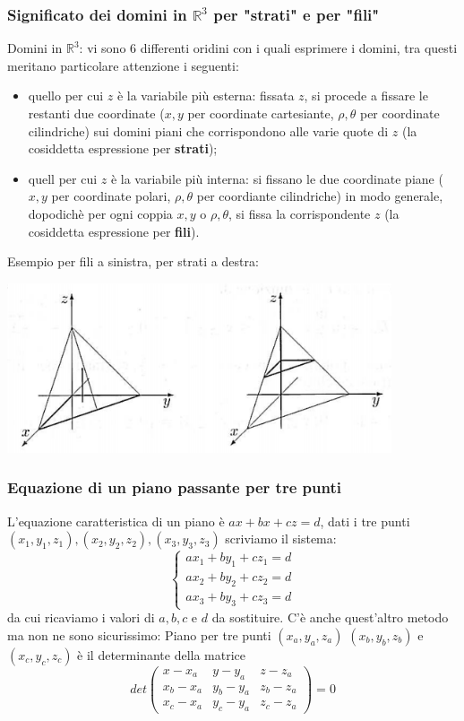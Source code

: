\subsubsection{Significato dei domini in $\mathbb{R}^3$ per "strati" e per "fili"}
Domini in $\mathbb{R}^3$: vi sono 6 differenti oridini con i quali esprimere i domini, tra questi meritano particolare attenzione i seguenti:
\begin{itemize}
    \item quello per cui $z$ è la variabile più esterna: fissata $z$, si procede a fissare le restanti due coordinate ($x,y$ per coordinate cartesiante, $\rho, \theta$ per coordinate cilindriche) sui domini piani che corrispondono alle varie quote di $z$ (la cosiddetta espressione per \textbf{strati});
    \item quell per cui $z$ è la variabile più interna: si fissano le due coordinate piane ($x,y$ per coordinate polari, $\rho, \theta$ per coordiante cilindriche) in modo generale, dopodichè per ogni coppia $x,y$ o $\rho, \theta$, si fissa la corrispondente $z$ (la cosiddetta espressione per \textbf{fili}).
\end{itemize}
Esempio per fili a sinistra, per strati a destra:
\begin{center}
    \includegraphics[height=5cm]{../6-integrali doppi e tripli (analisi II)/img2.PNG}
\end{center}
\subsubsection{Equazione di un piano passante per tre punti}
L'equazione caratteristica di un piano è $ax + bx + cz = d$, dati i tre punti $(x_1,y_1,z_1), (x_2,y_2,z_2), (x_3,y_3,z_3)$ scriviamo il sistema:
\[
    \begin{cases}
        a x_1 + by_1 + c z_1 = d\\
        a x_2 + by_2 + c z_2 = d\\
        a x_3 + by_3 + c z_3 = d
    \end{cases}
\]
da cui ricaviamo i valori di $a,b,c$ e $d$ da sostituire.\newline
\newline
C'è anche quest'altro metodo ma non ne sono sicurissimo:\newline
Piano per tre punti $(x_a, y_a, z_a)$ $(x_b, y_b, z_b)$ e $(x_c, y_c, z_c)$ è il determinante della matrice 
\[
    det\left(\begin{matrix}
        x-x_a & y-y_a & z-z_a\\
        x_b-x_a & y_b-y_a & z_b-z_a\\
        x_c-x_a & y_c - y_a & z_c -z_a 
    \end{matrix}\right) = 0
\]
